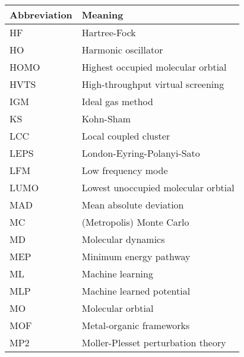 \documentclass[../main.tex]{subfiles}
\begin{document}
\begin{table}[h!]
\def\arraystretch{2.0}
\begin{tabularx}{\textwidth}{YY}
Abbreviation & Meaning \\
\hline
HF	&	Hartree-Fock	\\
HO	&	Harmonic oscillator	\\
HOMO	&	Highest occupied molecular orbtial	\\
HVTS	&	High-throughput virtual screening	\\
IGM	&	Ideal gas method	\\
KS	&	Kohn-Sham	\\
LCC	&	Local coupled cluster	\\
LEPS	&	London-Eyring-Polanyi-Sato	\\
LFM	&	Low frequency mode	\\
LUMO	&	Lowest unoccupied molecular orbtial	\\
MAD	&	Mean absolute deviation	\\
MC	&	(Metropolis) Monte Carlo	\\
MD	&	Molecular dynamics	\\
MEP	&	Minimum energy pathway	\\
ML	&	Machine learning	\\
MLP	&	Machine learned potential	\\
MO	&	Molecular orbtial	\\
MOF	&	Metal-organic frameworks	\\
MP2	&	Moller-Plesset perturbation theory	\\
\end{tabularx}
\end{table}
\newpage
\end{document}
